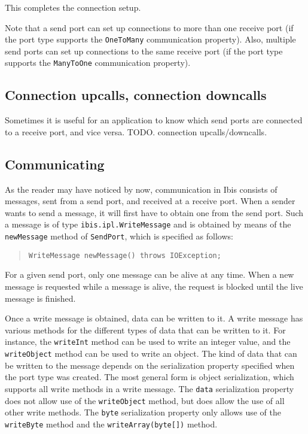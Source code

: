 \documentclass[10pt]{article}
\newcommand{\mysubsection}[1]{\subsection{#1}\label{#1}}
\begin{document}
This completes the connection setup.

Note that a send port can set up connections to more than one
receive port (if the port type supports the \verb+OneToMany+
communication property). Also, multiple send ports can set up
connections to the same receive port (if the port type supports
the \verb+ManyToOne+ communication property).

\subsection{Connection upcalls, connection downcalls}
Sometimes it is useful for an application to know which send ports
are connected to a receive port, and vice versa.
TODO. connection upcalls/downcalls.


\mysubsection{Communicating}

As the reader may have noticed by now, communication in Ibis
consists of messages, sent from a send port, and received at a
receive port. When a sender wants to send a message, it will first
have to obtain one from the send port. Such a message is of
type \verb+ibis.ipl.WriteMessage+ and is obtained by means of
the \verb+newMessage+ method of \verb+SendPort+, which is specified
as follows:

\begin{quote}
\begin{verbatim}
WriteMessage newMessage() throws IOException;
\end{verbatim}
\end{quote}

For a given send port, only one message can be alive at any time.
When a new message is requested while a message is alive, the request
is blocked until the live message is finished.

Once a write message is obtained, data can be written to it.
A write message has various methods for the different types of
data that can be written to it. For instance, the
\verb+writeInt+ method can be used to write an integer value,
and the \verb+writeObject+ method can be used to write an object.
The kind of data that can be written to the message depends on the
serialization property specified when the port type was created.
The most general form is object serialization, which supports 
all write methods in a write message.
The \verb+data+ serialization property does not allow use of the
\verb+writeObject+ method, but does allow the use of all other write
methods. The \verb+byte+ serialization property only allows use
of the \verb+writeByte+ method and the \verb+writeArray(byte[])+
method.
\end{document}
